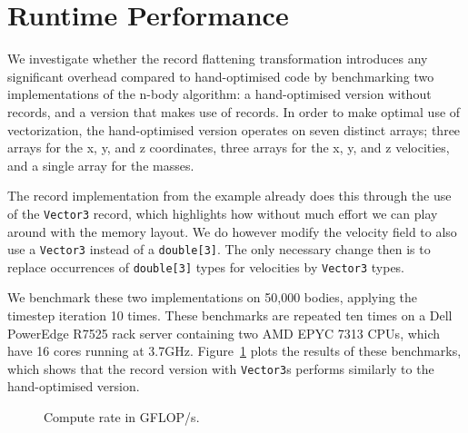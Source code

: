 
\section{Runtime Performance}\label{sec:case}

We investigate whether the record flattening transformation introduces any significant overhead compared to hand-optimised code by benchmarking two implementations of the n-body algorithm: a hand-optimised version without records, and a version that makes use of records.
In order to make optimal use of vectorization, the hand-optimised version operates on seven distinct arrays; three arrays for the x, y, and z coordinates, three arrays for the x, y, and z velocities, and a single array for the masses.

The record implementation from the example already does this through the use of the \texttt{Vector3} record, which highlights how without much effort we can play around with the memory layout.
We do however modify the velocity field to also use a \texttt{Vector3} instead of a \texttt{double[3]}.
The only necessary change then is to replace occurrences of \texttt{double[3]} types for velocities by \texttt{Vector3} types.

We benchmark these two implementations on 50,000 bodies, applying the timestep iteration 10 times.
These benchmarks are repeated ten times on a Dell PowerEdge R7525 rack server containing two AMD EPYC 7313 CPUs, which have 16 cores running at 3.7GHz.
Figure~\ref{fig:benchmark} plots the results of these benchmarks, which shows that the record version with \texttt{Vector3}s performs similarly to the hand-optimised version.

\begin{figure}[ht!]
    \centering
    \caption{Compute rate in GFLOP/s.}
    \label{fig:benchmark}
\end{figure}
